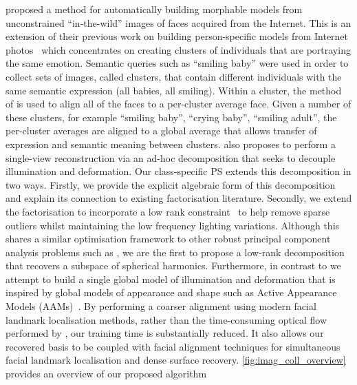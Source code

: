 \citet{KemelmacherShlizerman:2013iv} proposed a method for automatically
building morphable models from unconstrained ``in-the-wild'' images of faces
acquired from the Internet. This is an extension of their previous work
on building person-specific models from Internet photos~\cite{kemelmacher2011face}
which concentrates on creating clusters of individuals that are portraying
the same emotion. Semantic queries such as ``smiling baby'' were used in order
to collect sets of images, called clusters, that contain different individuals
with the same semantic expression (all babies, all smiling).
Within a cluster, the method of
\citet{kemelmacher2012collection} is used to align all of the faces to a
per-cluster average face. Given a number of these clusters, for example
``smiling baby'', ``crying baby'', ``smiling adult'', the per-cluster averages
are aligned to a global average that allows transfer of expression and
semantic meaning between clusters. \citet{KemelmacherShlizerman:2013iv} also
proposes to perform a single-view reconstruction via an ad-hoc decomposition
that seeks to decouple illumination and deformation. Our class-specific
PS extends this decomposition in two ways. Firstly, we
provide the explicit algebraic form of this decomposition and explain its
connection to existing factorisation literature. Secondly, we extend the
factorisation to incorporate a low rank
constraint~\cite{candes2011robust,peng2012rasl,sagonas2014raps,cheng2013rank,%
wu2010robust,lu2013uncalibrated} to help remove sparse outliers
whilst maintaining the low frequency lighting variations. Although this shares a
similar optimisation framework to other
robust principal component analysis problems such as
\cite{candes2011robust,peng2012rasl,wu2010robust,lu2013uncalibrated},
we are the first to propose a low-rank decomposition that recovers a subspace
of spherical harmonics. Furthermore, in contrast to \citet{KemelmacherShlizerman:2013iv}
we attempt to build a single global model of illumination and deformation
that is inspired by global models of appearance and shape such as
Active Appearance Models (AAMs)~\cite{cootes2001active}. By performing a coarser
alignment using modern facial landmark localisation methods, rather than
the time-consuming optical flow performed by \citet{KemelmacherShlizerman:2013iv},
our training time is substantially reduced.
It also allows our recovered basis to be coupled with facial alignment
techniques for simultaneous facial landmark localisation and dense surface
recovery.
\cref{fig:imag_coll_overview} provides an overview of our proposed algorithm
